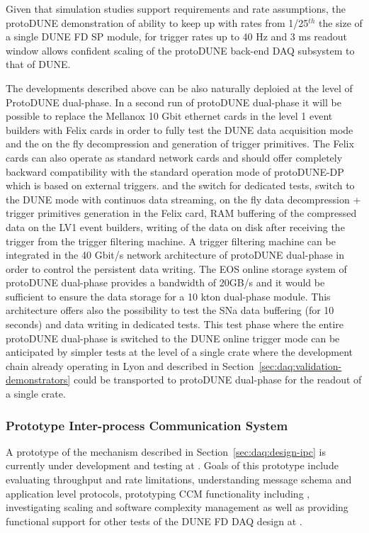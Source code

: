 Given that simulation studies support requirements and rate assumptions,
the protoDUNE demonstration of ability to keep up with rates from
1/25$^{th}$ the size of a single DUNE FD SP module, for trigger rates up
to 40 Hz and 3 ms readout window allows confident scaling of the
protoDUNE back-end DAQ subsystem to that of DUNE.

The developments described above can be also naturally deploied at the level of ProtoDUNE dual-phase. In a second run of
protoDUNE dual-phase it will be possible to replace the Mellanox 10 Gbit ethernet cards in the level 1 event builders with Felix cards in order to fully
test the DUNE data acquisition mode and the on the fly decompression and generation of trigger primitives. The Felix cards can also operate as standard
network cards and should offer completely backward compatibility with the standard operation mode of protoDUNE-DP which is based on external triggers.
and the switch for dedicated tests, switch to the DUNE mode with  continuos data streaming,  on the fly data decompression + trigger primitives generation in the Felix card,  RAM buffering of the compressed data on the LV1 event builders, writing of the data on disk after receiving the trigger from the trigger filtering machine. A trigger filtering machine can be integrated in the 40 Gbit/s network architecture of protoDUNE dual-phase in order to control the persistent data writing. The EOS online storage system of protoDUNE dual-phase provides a bandwidth of 20GB/s and it would be sufficient to ensure the data storage for a 10 kton dual-phase module. This architecture offers also the possibility to test the SNa data buffering (for 10 seconds) and data writing in dedicated tests. This test phase where the entire protoDUNE dual-phase is switched to the DUNE online trigger mode can be anticipated by simpler tests at the level of a single crate where the development chain already operating in Lyon and described in Section~\ref{sec:daq:validation-demonstrators} could be transported to protoDUNE dual-phase for the readout of a single crate.


\subsubsection{Prototype Inter-process Communication System}

A prototype of the  mechanism described in
Section~\ref{sec:daq:design-ipc} is currently under development and testing at
. 
Goals of this prototype include evaluating throughput and rate limitations,
understanding message schema and application level protocols, prototyping CCM
functionality including , investigating scaling and software
complexity management as well as providing functional support for other tests of
the DUNE FD DAQ design at .


